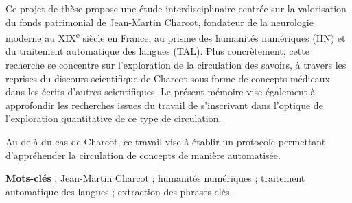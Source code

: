 
%


Ce projet de thèse propose une étude interdisciplinaire centrée sur la valorisation du fonds patrimonial de Jean-Martin Charcot, fondateur de la neurologie moderne au XIX\textsuperscript{e} siècle en France, au prisme des humanités numériques (\textsc{HN}) et du traitement automatique des langues (\textsc{TAL}). Plus concrètement, cette recherche se concentre sur l'exploration de la circulation des savoirs, à travers les reprises du discours scientifique de Charcot sous forme de concepts médicaux dans les écrits d'autres scientifiques. Le présent mémoire vise également à approfondir les recherches issues du travail de \citet{petkovic2023circulation} s'inscrivant dans l'optique de l'exploration quantitative de ce type de circulation. 


Au-delà du cas de Charcot, ce travail vise à établir un protocole permettant d'appréhender la circulation de concepts de manière automatisée.


\textbf{Mots-clés} : Jean-Martin Charcot ; humanités numériques ; traitement automatique des langues ; extraction des phrases-clés.
